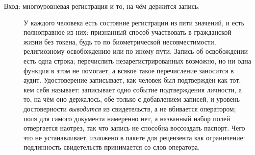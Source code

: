 \begin{description}
  \item[Вход: многоуровневая регистрация и то, на чём держится запись.] У каждого человека есть
    состояние регистрации из пяти значений, и  есть полноправное из них: признанный
    способ участвовать в гражданской жизни без токена, будь то по биометрической несовместимости,
    религиозному освобождению или по иному пути. Запись об освобождении есть одна строка;
    перечислить незарегистрированных возможно, но ни одна функция в этом не помогает, а всякое
    такое перечисление заносится в аудит. Удостоверение записывает, как человек был подтверждён
    как тот, кем себя называет:  записывает одно событие подтверждения личности, а
     то, на чём оно держалось, обе только с добавлением записей, и
    уровень достоверности \emph{выводится} из свидетельств, а не вбивается оператором; поля для
    самого документа намеренно нет, а названный набор полей отвергается наотрез, так что запись не
    способна воссоздать паспорт. Чего это не устанавливает, изложено в пакете для рецензента как
    ограничение: подлинность свидетельств принимается со слов оператора. \sImpl


\end{description}
